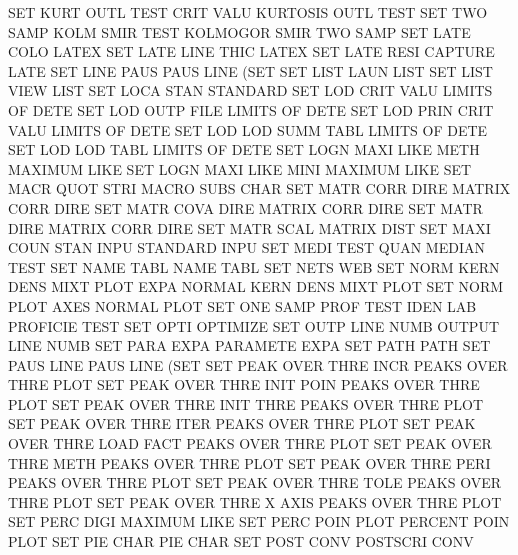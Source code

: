 SET      KURT OUTL TEST CRIT VALU       KURTOSIS OUTL TEST
SET      TWO  SAMP KOLM SMIR TEST       KOLMOGOR SMIR TWO  SAMP
SET      LATE COLO                      LATEX
SET      LATE LINE THIC                 LATEX
SET      LATE RESI                      CAPTURE  LATE
SET      LINE PAUS                      PAUS     LINE (SET
SET      LIST LAUN                      LIST
SET      LIST VIEW                      LIST
SET      LOCA STAN                      STANDARD
SET      LOD      CRIT VALU             LIMITS   OF   DETE
SET      LOD      OUTP FILE             LIMITS   OF   DETE
SET      LOD      PRIN CRIT VALU        LIMITS   OF   DETE
SET      LOD      LOD  SUMM TABL        LIMITS   OF   DETE
SET      LOD      LOD  TABL             LIMITS   OF   DETE
SET      LOGN MAXI LIKE METH            MAXIMUM  LIKE
SET      LOGN MAXI LIKE MINI            MAXIMUM  LIKE
SET      MACR QUOT STRI                 MACRO    SUBS CHAR
SET      MATR CORR DIRE                 MATRIX   CORR DIRE
SET      MATR COVA DIRE                 MATRIX   CORR DIRE
SET      MATR DIRE                      MATRIX   CORR DIRE
SET      MATR SCAL                      MATRIX   DIST
SET      MAXI COUN STAN INPU            STANDARD INPU
SET      MEDI TEST QUAN                 MEDIAN   TEST
SET      NAME TABL                      NAME     TABL
SET      NETS                           WEB
SET      NORM KERN DENS MIXT PLOT EXPA  NORMAL   KERN DENS MIXT PLOT
SET      NORM PLOT AXES                 NORMAL   PLOT
SET      ONE  SAMP PROF TEST IDEN LAB   PROFICIE TEST
SET      OPTI                           OPTIMIZE
SET      OUTP LINE NUMB                 OUTPUT   LINE NUMB
SET      PARA EXPA                      PARAMETE EXPA
SET      PATH                           PATH
SET      PAUS LINE                      PAUS     LINE (SET
SET      PEAK OVER THRE INCR            PEAKS    OVER THRE PLOT
SET      PEAK OVER THRE INIT POIN       PEAKS    OVER THRE PLOT
SET      PEAK OVER THRE INIT THRE       PEAKS    OVER THRE PLOT
SET      PEAK OVER THRE ITER            PEAKS    OVER THRE PLOT
SET      PEAK OVER THRE LOAD FACT       PEAKS    OVER THRE PLOT
SET      PEAK OVER THRE METH            PEAKS    OVER THRE PLOT
SET      PEAK OVER THRE PERI            PEAKS    OVER THRE PLOT
SET      PEAK OVER THRE TOLE            PEAKS    OVER THRE PLOT
SET      PEAK OVER THRE X    AXIS       PEAKS    OVER THRE PLOT
SET      PERC DIGI                      MAXIMUM  LIKE
SET      PERC POIN PLOT                 PERCENT  POIN PLOT
SET      PIE  CHAR                      PIE      CHAR
SET      POST CONV                      POSTSCRI CONV
